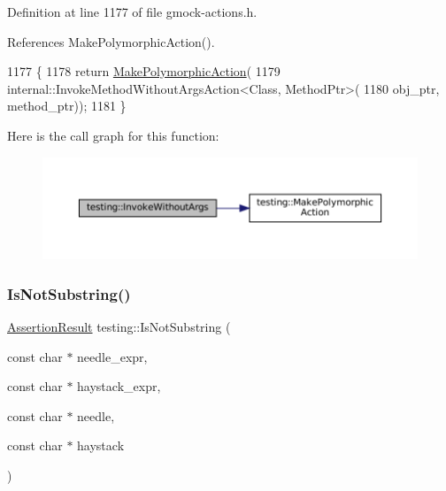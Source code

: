 Definition at line 1177 of file gmock-\/actions.\+h.



References Make\+Polymorphic\+Action().


\begin{DoxyCode}
1177                                                         \{
1178   \textcolor{keywordflow}{return} \hyperlink{namespacetesting_a36bd06c5ea972c6df0bd9f40a7a94c65}{MakePolymorphicAction}(
1179       internal::InvokeMethodWithoutArgsAction<Class, MethodPtr>(
1180           obj\_ptr, method\_ptr));
1181 \}
\end{DoxyCode}
Here is the call graph for this function\+:
\nopagebreak
\begin{figure}[H]
\begin{center}
\leavevmode
\includegraphics[width=350pt]{namespacetesting_ab75325d71a8c37db94f349243815c728_cgraph}
\end{center}
\end{figure}
\mbox{\label{namespacetesting_a2288dcf4249f88af67dcd46544dc49a6}} 
\subsubsection{\texorpdfstring{Is\+Not\+Substring()}{IsNotSubstring()}\hspace{0.1cm}{\footnotesize\ttfamily [1/3]}}
{\footnotesize\ttfamily \hyperlink{classtesting_1_1AssertionResult}{Assertion\+Result} testing\+::\+Is\+Not\+Substring (\begin{DoxyParamCaption}\item[{const char $\ast$}]{needle\+\_\+expr,  }\item[{const char $\ast$}]{haystack\+\_\+expr,  }\item[{const char $\ast$}]{needle,  }\item[{const char $\ast$}]{haystack }\end{DoxyParamCaption})}



